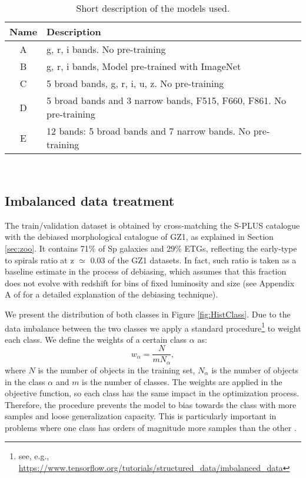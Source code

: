 \documentclass[fleqn,usenatbib]{mnras}
\begin{document}
\begin{table}
\small
\caption{\label{tab:models_desc} Short description of the models used.}
\begin{tabular}{cl}
\hline\hline
Name & Description  \\

\hline 

A & g, r, i bands. No pre-training \\
B & g, r, i bands, Model pre-trained with ImageNet  \\
C & 5 broad bands, g, r, i, u, z. No pre-training  \\
D & 5 broad bands and 3 narrow bands, F515, F660, F861. No pre-training \\
E & 12 bands: 5 broad bands and 7 narrow bands. No pre-training  \\

\hline \hline
\end{tabular}
\\
\end{table}



\subsection{Imbalanced data treatment}
The train/validation dataset is obtained by cross-matching the \mbox{S-PLUS} catalogue with the debiased morphological catalogue of GZ1, as explained in  Section \ref{sec:zoo}. It contains 71\% of Sp galaxies and 29\% ETGs, reflecting the  early-type to spirals ratio at z $\simeq$ 0.03 of the GZ1 datasets. In fact, such ratio is taken as a baseline estimate in the process of debiasing, which assumes that this fraction does not evolve with redshift for bins of fixed luminosity and size (see Appendix A of \citealt{bamford2009galaxy} for a detailed explanation of the debiasing technique). 

We present the distribution of both classes in Figure \ref{fig:HistClass}. Due to the data imbalance between the two classes we apply a standard procedure\footnote{see, e.g.,  \url{https://www.tensorflow.org/tutorials/structured_data/imbalanced_data}} to weight each class. We define the weights of a certain class $\alpha$ as:
\begin{equation}
   w_{\alpha}= \frac{N}{m N_{\alpha}},   
\end{equation}
where $N$ is the number of objects in the training set, $N_{\alpha}$ is the number of objects in the class $\alpha$ and $m$ is the number of classes.
The weights are applied in the objective function, so each class has the same impact in the optimization process. Therefore, the procedure prevents the model to bias towards the class with more samples and loose generalization capacity. This is particularly important in problems where one class has orders of magnitude more samples than the other \citep{sun2009classification}. 
\end{document}
